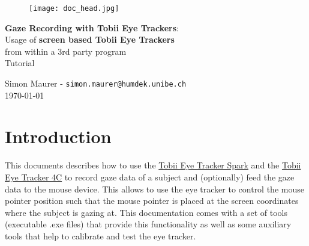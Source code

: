 \documentclass[a4paper,oneside]{book}
\begin{document}
\begin{figure}[h]
  \texttt{[image: doc\_head.jpg]}
\end{figure}

\parindent=0pt
\parskip=0.25cm

\begin{center}
\fontsize{20}{21}\selectfont

\textbf{Gaze Recording with Tobii Eye Trackers}:\\
Usage of \textbf{screen based Tobii Eye Trackers}\\
from within a 3rd party program\\
\vskip 6mm
Tutorial
\vskip 6mm

\fontsize{13}{14}\selectfont
Simon Maurer - \texttt{simon.maurer@humdek.unibe.ch}\\
\today
\end{center}

\tableofcontents

\chapter{Introduction}\label{sec.intro}
This documents describes how to use the \href{https://www.tobii.com/products/eye-trackers/screen-based/tobii-pro-spark}{Tobii Eye Tracker Spark} and the \href{https://tobiigaming.com/eye-tracker-4c/}{Tobii Eye Tracker 4C} to record gaze data of a subject and (optionally) feed the gaze data to the mouse device.
This allows to use the eye tracker to control the mouse pointer position such that the mouse pointer is placed at the screen coordinates where the subject is gazing at.
This documentation comes with a set of tools (executable .exe files) that provide this functionality as well as some auxiliary tools that help to calibrate and test the eye tracker.
\end{document}
